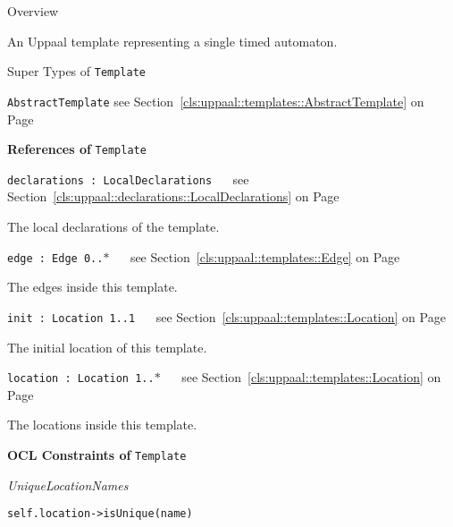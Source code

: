 	\begin{longdescription}
		\item[Overview] 		
				

	

		An Uppaal template representing a single timed automaton.		
		\item[Super Types of \texttt{Template}] ~
			\begin{longdescription}
				\item[\texttt{AbstractTemplate}] see Section~\ref{cls:uppaal::templates::AbstractTemplate} on Page~\pageref{cls:uppaal::templates::AbstractTemplate}						\end{longdescription}
		
	
			\item[\textbf{References of} \texttt{Template}] ~
			\begin{longdescription}
	\item[\texttt{declarations : LocalDeclarations 	}] ~
	see Section~\ref{cls:uppaal::declarations::LocalDeclarations} on Page~\pageref{cls:uppaal::declarations::LocalDeclarations}
	
	\nopagebreak
		
				

	

		The local declarations of the template.		
	\item[\texttt{edge : Edge 	\symbol{"5B}0..$*$\symbol{"5D}
}] ~
	see Section~\ref{cls:uppaal::templates::Edge} on Page~\pageref{cls:uppaal::templates::Edge}
	
	\nopagebreak
		
				

	

		The edges inside this template.		
	\item[\texttt{init : Location 	\symbol{"5B}1..1\symbol{"5D}
}] ~
	see Section~\ref{cls:uppaal::templates::Location} on Page~\pageref{cls:uppaal::templates::Location}
	
	\nopagebreak
		
				

	

		The initial location of this template.		
	\item[\texttt{location : Location 	\symbol{"5B}1..$*$\symbol{"5D}
}] ~
	see Section~\ref{cls:uppaal::templates::Location} on Page~\pageref{cls:uppaal::templates::Location}
	
	\nopagebreak
		
				

	

		The locations inside this template.		
			\end{longdescription}
			\item[\textbf{OCL Constraints of} \texttt{Template}] ~
			\begin{longdescription}
	\item[\small\textit{UniqueLocationNames}] ~ 
	\nopagebreak
	
		\begin{lstlisting}[breaklines=true]
self.location->isUnique(name)		\end{lstlisting}
			\end{longdescription}
	
	\end{longdescription}
	
